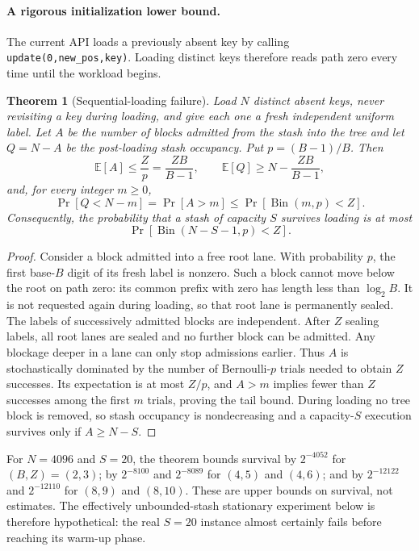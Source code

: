 \documentclass[11pt]{article}
\newtheorem{theorem}{Theorem}
\begin{document}
\paragraph{A rigorous initialization lower bound.}
The current API loads a previously absent key by calling
\texttt{update(0,new\_pos,key)}.  Loading distinct keys therefore reads path
zero every time until the workload begins.

\begin{theorem}[Sequential-loading failure]
Load $N$ distinct absent keys, never revisiting a key during loading, and give
each one a fresh independent uniform label.  Let $A$ be the number of blocks
admitted from the stash into the tree and let $Q=N-A$ be the post-loading stash
occupancy.  Put $p=(B-1)/B$.  Then
\[
  \mathbb{E}[A]\leq\frac{Z}{p}=\frac{ZB}{B-1},
  \qquad
  \mathbb{E}[Q]\geq N-\frac{ZB}{B-1},
\]
and, for every integer $m\geq0$,
\[
  \Pr[Q<N-m]=\Pr[A>m]
  \leq \Pr[\operatorname{Bin}(m,p)<Z].
\]
Consequently, the probability that a stash of capacity $S$ survives loading is
at most
\[
  \Pr[\operatorname{Bin}(N-S-1,p)<Z].
\]
\end{theorem}

\begin{proof}
Consider a block admitted into a free root lane.  With probability $p$, the
first base-$B$ digit of its fresh label is nonzero.  Such a block cannot move
below the root on path zero: its common prefix with zero has length less than
$\log_2B$.  It is not requested again during loading, so that root lane is
permanently sealed.  The labels of successively admitted blocks are independent.
After $Z$ sealing labels, all root lanes are sealed and no further block can be
admitted.  Any blockage deeper in a lane can only stop admissions earlier.
Thus $A$ is stochastically dominated by the number of Bernoulli-$p$ trials
needed to obtain $Z$ successes.  Its expectation is at most $Z/p$, and
$A>m$ implies fewer than $Z$ successes among the first $m$ trials, proving the
tail bound.  During loading no tree block is removed, so stash occupancy is
nondecreasing and a capacity-$S$ execution survives only if $A\geq N-S$.
\end{proof}

For $N=4096$ and $S=20$, the theorem bounds survival by $2^{-4052}$ for
$(B,Z)=(2,3)$; by $2^{-8100}$ and $2^{-8089}$ for $(4,5)$ and $(4,6)$; and by
$2^{-12122}$ and $2^{-12110}$ for $(8,9)$ and $(8,10)$.  These are upper bounds
on survival, not estimates.  The effectively unbounded-stash stationary
experiment below is therefore hypothetical: the real $S=20$ instance almost
certainly fails before reaching its warm-up phase.
\end{document}
